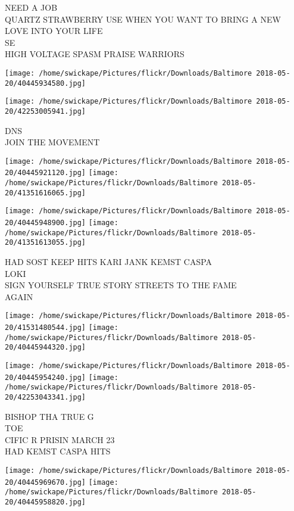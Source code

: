 \documentclass[10pt,letterpaper]{article}
\begin{document}
NEED A JOB\\
QUARTZ STRAWBERRY USE WHEN YOU WANT TO BRING A NEW LOVE INTO YOUR LIFE\\
SE\\
HIGH VOLTAGE SPASM PRAISE WARRIORS
\pagebreak

\texttt{[image: /home/swickape/Pictures/flickr/Downloads/Baltimore 2018-05-20/40445934580.jpg]}

\vspace{0.25in}
\texttt{[image: /home/swickape/Pictures/flickr/Downloads/Baltimore 2018-05-20/42253005941.jpg]}

DNS\\
JOIN THE MOVEMENT
\pagebreak

\texttt{[image: /home/swickape/Pictures/flickr/Downloads/Baltimore 2018-05-20/40445921120.jpg]}
\texttt{[image: /home/swickape/Pictures/flickr/Downloads/Baltimore 2018-05-20/41351616065.jpg]}

\texttt{[image: /home/swickape/Pictures/flickr/Downloads/Baltimore 2018-05-20/40445948900.jpg]}
\texttt{[image: /home/swickape/Pictures/flickr/Downloads/Baltimore 2018-05-20/41351613055.jpg]}

HAD SOST KEEP HITS KARI JANK KEMST CASPA\\
LOKI\\
SIGN YOURSELF TRUE STORY STREETS TO THE FAME\\
AGAIN
\pagebreak

\texttt{[image: /home/swickape/Pictures/flickr/Downloads/Baltimore 2018-05-20/41531480544.jpg]}
\texttt{[image: /home/swickape/Pictures/flickr/Downloads/Baltimore 2018-05-20/40445944320.jpg]}

\texttt{[image: /home/swickape/Pictures/flickr/Downloads/Baltimore 2018-05-20/40445954240.jpg]}
\texttt{[image: /home/swickape/Pictures/flickr/Downloads/Baltimore 2018-05-20/42253043341.jpg]}

BISHOP THA TRUE G\\
TOE\\
CIFIC R PRISIN MARCH 23\\
HAD KEMST CASPA HITS
\pagebreak

\texttt{[image: /home/swickape/Pictures/flickr/Downloads/Baltimore 2018-05-20/40445969670.jpg]}
\texttt{[image: /home/swickape/Pictures/flickr/Downloads/Baltimore 2018-05-20/40445958820.jpg]}
\end{document}
